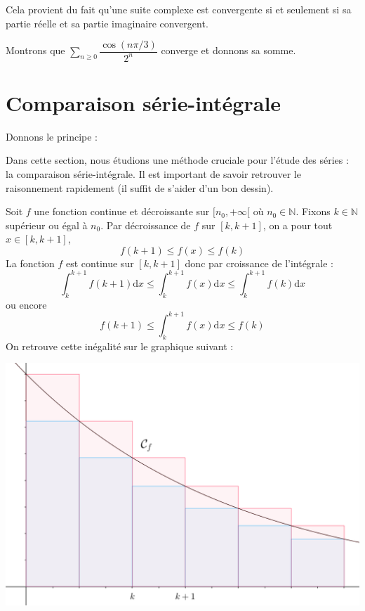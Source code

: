 \documentclass[french,11pt,twoside]{VcCours}
\newcommand{\dx}{\text{d}x}
\newcommand{\Sum}[2]{\ensuremath{\textstyle{\sum\limits_{#1}^{#2}}}}
\begin{document}
\begin{Demonstration}{} 
Cela provient du fait qu'une suite complexe est convergente si et seulement si sa partie réelle et sa partie imaginaire convergent.
\end{Demonstration}

\begin{Exemple} Montrons que $\Sum{n \geq 0}{} \dfrac{\cos(n \pi/3)}{2^n}$ converge et donnons sa somme.

	\newpage
\vspace*{3cm}
\end{Exemple}

\section{Comparaison série-intégrale}

Donnons le principe :


Dans cette section, nous étudions une méthode cruciale pour l'étude des séries : la comparaison série-intégrale. Il est important de savoir retrouver le raisonnement rapidement (il suffit de s'aider d'un bon dessin).

Soit $f$ une fonction continue et décroissante sur $[n_0, + \infty[$ où $n_0 \in \mathbb{N}$. Fixons $k \in \mathbb{N}$ supérieur ou égal à $n_0$. Par décroissance de $f$ sur $[k,k+1]$, on a pour tout $x \in [k,k+1]$,
$$ f(k+1) \leq f(x) \leq f(k)$$
La fonction $f$ est continue sur $[k,k+1]$ donc par croissance de l'intégrale :
$$ \int_{k}^{k+1} f(k+1) \dx \leq \int_{k}^{k+1} f(x) \dx \leq \int_{k}^{k+1} f(k) \dx$$
ou encore 
\begin{equation}\label{SerieInt} f(k+1) \leq  \int_{k}^{k+1} f(x) \dx \leq  f(k) 
\end{equation}
On retrouve cette inégalité sur le graphique suivant :

\vspace{0.3cm}

\begin{center}
\includegraphics[scale=0.3]{serieInt}
\end{center}
\end{document}
